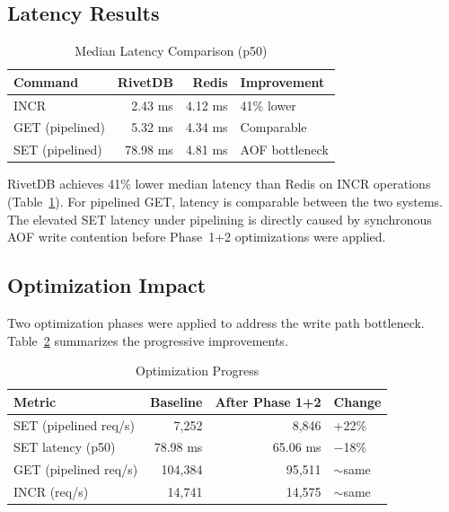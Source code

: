 \documentclass[conference,a4paper]{IEEEtran}
\begin{document}
\subsection{Latency Results}

\begin{table}[htbp]
\caption{Median Latency Comparison (p50)}
\label{tab:latency}
\centering
\begin{tabular}{@{}lrrl@{}}
\toprule
\textbf{Command} & \textbf{RivetDB} & \textbf{Redis} & \textbf{Improvement} \\
\midrule
INCR & 2.43 ms & 4.12 ms & 41\% lower \\
GET (pipelined) & 5.32 ms & 4.34 ms & Comparable \\
SET (pipelined) & 78.98 ms & 4.81 ms & AOF bottleneck \\
\bottomrule
\end{tabular}
\end{table}

RivetDB achieves 41\% lower median latency than Redis on INCR operations (Table~\ref{tab:latency}). For pipelined GET, latency is comparable between the two systems. The elevated SET latency under pipelining is directly caused by synchronous AOF write contention before Phase~1+2 optimizations were applied.

\subsection{Optimization Impact}

Two optimization phases were applied to address the write path bottleneck. Table~\ref{tab:optprogress} summarizes the progressive improvements.

\begin{table}[htbp]
\caption{Optimization Progress}
\label{tab:optprogress}
\centering
\begin{tabular}{@{}lrrl@{}}
\toprule
\textbf{Metric} & \textbf{Baseline} & \textbf{After Phase 1+2} & \textbf{Change} \\
\midrule
SET (pipelined req/s) & 7,252 & 8,846 & +22\% \\
SET latency (p50) & 78.98 ms & 65.06 ms & $-$18\% \\
GET (pipelined req/s) & 104,384 & 95,511 & $\sim$same \\
INCR (req/s) & 14,741 & 14,575 & $\sim$same \\
\bottomrule
\end{tabular}
\end{table}
\end{document}
